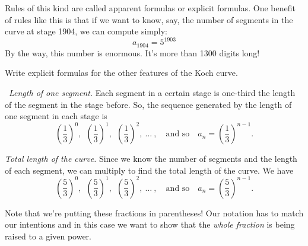 Rules of this kind are called apparent formulas or explicit formulas. One benefit of rules like this is that if we want to know, say, the number of segments in the curve at stage 1904, we can compute simply: \[a_{1904} = 5^{1903}\]
By the way, this number is enormous. It's more than 1300 digits long!

\begin{boxedex}
Write explicit formulas for the other features of the Koch curve.

\exsoln\ \textit{Length of one segment.} Each segment in a certain stage is one-third the length of the segment in the stage before. So, the sequence generated by the length of one segment in each stage is
\[\left(\frac{1}{3}\right)^0,
~~ \left(\frac{1}{3}\right)^1,
~~ \left(\frac{1}{3}\right)^2,
~ \dotsc ~,
\quad\text{and so}\quad
a_n = \left(\frac{1}{3}\right)^{n-1}.\]

\textit{Total length of the curve.} Since we know the number of segments and the length of each segment, we can multiply to find the total length of the curve. We have \[\left(\frac{5}{3}\right)^0,
~~ \left(\frac{5}{3}\right)^1,
~~ \left(\frac{5}{3}\right)^2,
~ \dotsc ~,
\quad\text{and so}\quad
a_n = \left(\frac{5}{3}\right)^{n-1}.\]
\end{boxedex}

Note that we're putting these fractions in parentheses! Our notation has to match our intentions and in this case we want to show that the \textit{whole fraction} is being raised to a given power.

